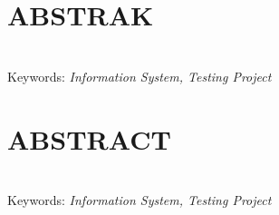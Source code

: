 %
 {}
\chapter*{ABSTRAK}

\begin{singlespace}
	\blindtext \\[20pt]
	Keywords: \textit{Information System, Testing Project}
\end{singlespace}

\newpage

 {}
\chapter*{ABSTRACT}

\begin{singlespace}
	\blindtext \\[20pt]
	Keywords: \textit{Information System, Testing Project}
\end{singlespace}

\newpage

